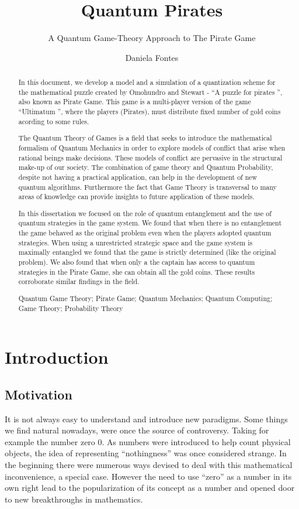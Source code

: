 \documentclass[10pt,twocolumn]{llncs}
\title{Quantum Pirates} %
\subtitle{A Quantum Game-Theory Approach to The Pirate Game}
\author{Daniela Fontes}
\institute{	72390\\
		Instituto Superior T\'ecnico
\\
\email{daniela.fontesl@ist.utl.pt}
}
\begin{document}
	\maketitle

	\begin{abstract}
		In this document, we develop a model and a simulation of a quantization scheme for the mathematical puzzle created by Omohundro and Stewart - ``A puzzle for pirates '', also known as Pirate Game. This game is a multi-player version of the game ``Ultimatum '', where the players (Pirates), must distribute fixed number of gold coins acording to some rules.

The Quantum Theory of Games is a field that seeks to introduce the mathematical formalism of Quantum Mechanics in order to explore models of conflict that arise when rational beings make decisions. These models of conflict are pervasive in the structural make-up of our society. The combination of game theory and Quantum Probability, despite not having a practical application, can help in the development of new quantum algorithms. Furthermore the fact that Game Theory is transversal to many areas of knowledge can provide insights to future application of these models.

In this dissertation we focused on the role of quantum entanglement and the use of quantum strategies in the game system. We found that when there is no entanglement the game behaved as the original problem even when the players adopted quantum strategies. When using a unrestricted strategic space and the game system is maximally entangled we found that the game is strictly determined (like the original problem). We also found that when only a the captain has access to quantum strategies in the Pirate Game, she can obtain all the gold coins. These results corroborate similar findings in the field.

		\keywords Quantum Game Theory; Pirate Game; Quantum Mechanics; Quantum Computing; Game Theory; Probability Theory

\end{abstract}

\section{Introduction}
\subsection{Motivation}
\label{sec:int_motiv}
It is not always easy to understand and introduce new paradigms. Some things we find natural nowadays, were once the source of controversy. Taking for example the number zero $0$. As numbers were introduced to help count physical objects, the idea of representing ``nothingness'' was once considered strange. In the beginning there were numerous ways devised to deal with this mathematical inconvenience, a special case. However the need to use ``zero'' as a number in its own right lead to the popularization of its concept as a number and opened door to new breakthroughs in mathematics\cite{Kaplan2000}. 
\end{document}

